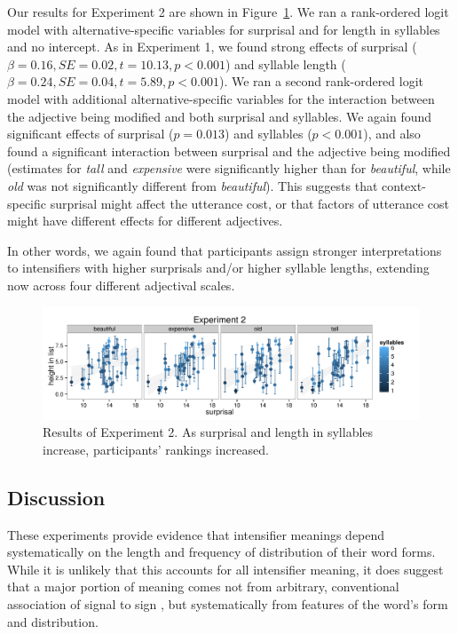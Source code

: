 \documentclass[10pt,letterpaper]{article}
\newcommand{\w}[1]{\emph{#1}}
\begin{document}
Our results for Experiment 2 are shown in Figure~\ref{exp2-plot}. We ran a rank-ordered logit model \cite{beggs1981, hausman1987} with alternative-specific variables for surprisal and for length in syllables and no intercept. As in Experiment 1, we found strong effects of surprisal ($\beta=0.16, SE=0.02, t=10.13, p<0.001$) and syllable length ($\beta=0.24, SE=0.04, t=5.89, p<0.001$).
We ran a second rank-ordered logit model with additional alternative-specific variables for the interaction between the adjective being modified and both surprisal and syllables. We again found significant effects of surprisal ($p=0.013$) and syllables ($p<0.001$), and also found a significant interaction between surprisal and the adjective being modified (estimates for \w{tall} and \w{expensive} were significantly higher than for \w{beautiful}, while \w{old} was not significantly different from \w{beautiful}).
This suggests that context-specific surprisal might affect the utterance cost, or that factors of utterance cost might have different effects for different adjectives.

In other words, we again found that participants assign stronger interpretations to intensifiers with higher surprisals and/or higher syllable lengths, extending now across four different adjectival scales.

\begin{figure}[hbt]
\begin{center}
\includegraphics[width=\textwidth]{../analysis/output/Experiment2/scatter.pdf}
\end{center}
\caption{Results of Experiment 2. As surprisal and length in syllables increase, participants' rankings increased.} 
\label{exp2-plot}
\end{figure}

\subsection{Discussion}    
These experiments provide evidence that intensifier meanings depend systematically on the length and frequency of distribution of their word forms.
While it is unlikely that this accounts for all intensifier meaning, it does suggest that a major portion of meaning comes not from arbitrary, conventional association of signal to sign \cite{saussure}, but systematically from features of the word's form and distribution.
\end{document}
